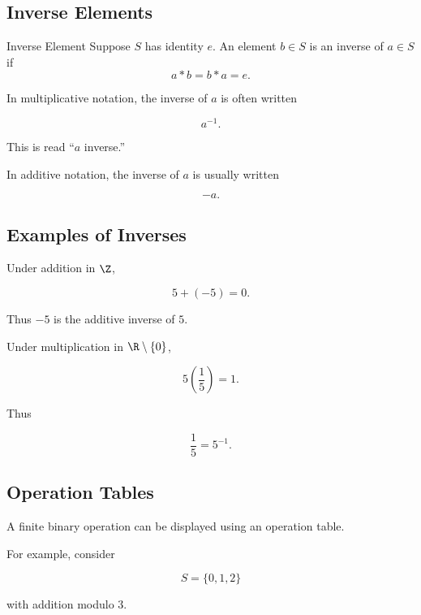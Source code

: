 \subsection{Inverse Elements}
\label{subsec:inverse-elements}

\begin{definitionbox}{Inverse Element}
Suppose \(S\) has identity \(e\). An element \(b\in S\) is an inverse of
\(a\in S\) if
\[ a*b=b*a=e. \]
\end{definitionbox}

In multiplicative notation, the inverse of \(a\) is often written

\[ a^{-1}. \]

This is read ``\(a\) inverse.''

In additive notation, the inverse of \(a\) is usually written

\[ -a. \]

\subsection{Examples of Inverses}
\label{subsec:examples-inverses}

Under addition in \(\Z\),

\[ 5+(-5)=0. \]

Thus \(-5\) is the additive inverse of \(5\).

Under multiplication in \(\R\setminus\{0\}\),

\[ 5\left(\frac15\right)=1. \]

Thus

\[ \frac15=5^{-1}. \]

\subsection{Operation Tables}
\label{subsec:operation-tables}

A finite binary operation can be displayed using an operation table.

For example, consider

\[ S=\{0,1,2\} \]

with addition modulo \(3\).

